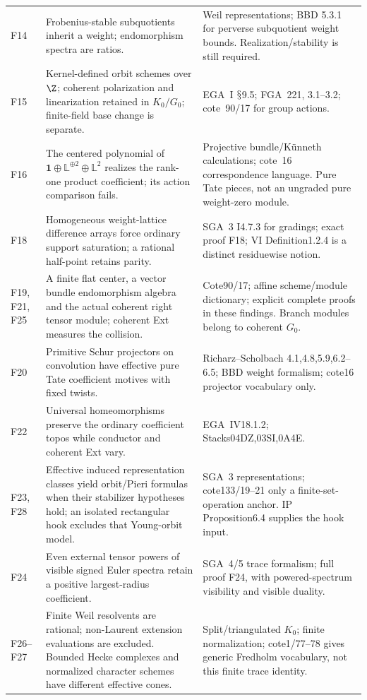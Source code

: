 \documentclass[11pt,a4paper]{article}
\renewcommand{\S}{\ensuremath{\mathsection}}
\theoremstyle{named}\newtheorem{finding}{Finding}[section]
\theoremstyle{definition}\newtheorem{definition}[finding]{Definition}
\theoremstyle{remark}\newtheorem{remark}[finding]{Remark}
\begin{document}
{\begin{longtable}{p{.12\linewidth}p{.48\linewidth}p{.32\linewidth}}
F14&Frobenius-stable subquotients inherit a weight; endomorphism spectra are ratios.&Weil representations; BBD 5.3.1 for perverse subquotient weight bounds. Realization/stability is still required.\\
F15&Kernel-defined orbit schemes over $\Z$; coherent polarization and linearization retained in $K_0/G_0$; finite-field base change is separate.&EGA~I \S9.5; FGA~221, 3.1--3.2; cote~90/17 for group actions.\\
F16&The centered polynomial of $\mathbf1\oplus\mathbb L^{\oplus2}\oplus\mathbb L^2$ realizes the rank-one product coefficient; its action comparison fails.&Projective bundle/K\"unneth calculations; cote~16 correspondence language. Pure Tate pieces, not an ungraded pure weight-zero module.\\
F18&Homogeneous weight-lattice difference arrays force ordinary support saturation; a rational half-point retains parity.&SGA~3 I4.7.3 for gradings; exact proof F18; VI Definition1.2.4 is a distinct residuewise notion.\\
F19, F21, F25&A finite flat center, a vector bundle endomorphism algebra and the actual coherent right tensor module; coherent Ext measures the collision.&Cote90/17; affine scheme/module dictionary; explicit complete proofs in these findings. Branch modules belong to coherent $G_0$.\\
F20&Primitive Schur projectors on convolution have effective pure Tate coefficient motives with fixed twists.&Richarz--Scholbach 4.1,4.8,5.9,6.2--6.5; BBD weight formalism; cote16 projector vocabulary only.\\
F22&Universal homeomorphisms preserve the ordinary coefficient topos while conductor and coherent Ext vary.&EGA~IV18.1.2; Stacks04DZ,03SI,0A4E.\\
F23, F28&Effective induced representation classes yield orbit/Pieri formulas when their stabilizer hypotheses hold; an isolated rectangular hook excludes that Young-orbit model.&SGA~3 representations; cote133/19--21 only a finite-set-operation anchor. IP Proposition6.4 supplies the hook input.\\
F24&Even external tensor powers of visible signed Euler spectra retain a positive largest-radius coefficient.&SGA~4/5 trace formalism; full proof F24, with powered-spectrum visibility and visible duality.\\
F26--F27&Finite Weil resolvents are rational; non-Laurent extension evaluations are excluded. Bounded Hecke complexes and normalized character schemes have different effective cones.&Split/triangulated $K_0$; finite normalization; cote1/77--78 gives generic Fredholm vocabulary, not this finite trace identity.\\\bottomrule
\end{longtable}}
\end{document}
